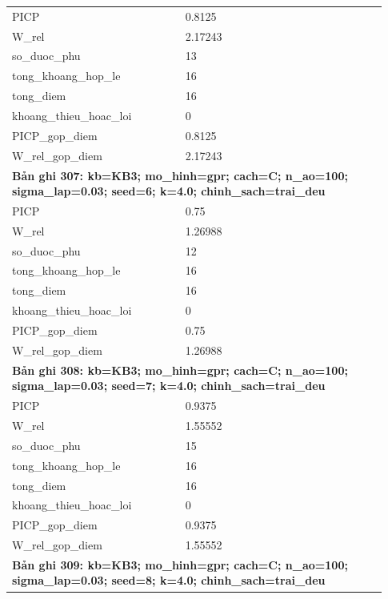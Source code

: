 \begin{longtable}{p{0.43\linewidth}p{0.50\linewidth}}
PICP & 0.8125 \\
W\_\allowbreak rel & 2.17243 \\
so\_\allowbreak duoc\_\allowbreak phu & 13 \\
tong\_\allowbreak khoang\_\allowbreak hop\_\allowbreak le & 16 \\
tong\_\allowbreak diem & 16 \\
khoang\_\allowbreak thieu\_\allowbreak hoac\_\allowbreak loi & 0 \\
PICP\_\allowbreak gop\_\allowbreak diem & 0.8125 \\
W\_\allowbreak rel\_\allowbreak gop\_\allowbreak diem & 2.17243 \\
\midrule
\multicolumn{2}{p{0.95\linewidth}}{\textbf{Bản ghi 307: kb=KB3; mo\_hinh=gpr; cach=C; n\_ao=100; sigma\_lap=0.03; seed=6; k=4.0; chinh\_sach=trai\_deu}} \\
PICP & 0.75 \\
W\_\allowbreak rel & 1.26988 \\
so\_\allowbreak duoc\_\allowbreak phu & 12 \\
tong\_\allowbreak khoang\_\allowbreak hop\_\allowbreak le & 16 \\
tong\_\allowbreak diem & 16 \\
khoang\_\allowbreak thieu\_\allowbreak hoac\_\allowbreak loi & 0 \\
PICP\_\allowbreak gop\_\allowbreak diem & 0.75 \\
W\_\allowbreak rel\_\allowbreak gop\_\allowbreak diem & 1.26988 \\
\midrule
\multicolumn{2}{p{0.95\linewidth}}{\textbf{Bản ghi 308: kb=KB3; mo\_hinh=gpr; cach=C; n\_ao=100; sigma\_lap=0.03; seed=7; k=4.0; chinh\_sach=trai\_deu}} \\
PICP & 0.9375 \\
W\_\allowbreak rel & 1.55552 \\
so\_\allowbreak duoc\_\allowbreak phu & 15 \\
tong\_\allowbreak khoang\_\allowbreak hop\_\allowbreak le & 16 \\
tong\_\allowbreak diem & 16 \\
khoang\_\allowbreak thieu\_\allowbreak hoac\_\allowbreak loi & 0 \\
PICP\_\allowbreak gop\_\allowbreak diem & 0.9375 \\
W\_\allowbreak rel\_\allowbreak gop\_\allowbreak diem & 1.55552 \\
\midrule
\multicolumn{2}{p{0.95\linewidth}}{\textbf{Bản ghi 309: kb=KB3; mo\_hinh=gpr; cach=C; n\_ao=100; sigma\_lap=0.03; seed=8; k=4.0; chinh\_sach=trai\_deu}} \\

\end{longtable}
